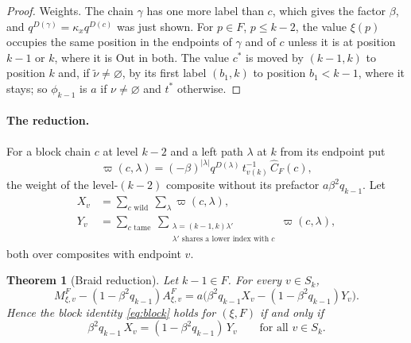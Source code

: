 \documentclass[11pt]{article}
\newtheorem{theorem}[proposition]{Theorem}
\begin{document}
\begin{proof}
Weights. The chain $\gamma$ has one more label than $c$, which gives
the factor $\beta$, and $q^{D(\gamma)}=\kappa_xq^{D(c)}$ was just
shown. For $p\in F$, $p\leq k-2$, the value $\xi(p)$ occupies the same
position in the endpoints of $\gamma$ and of $c$ unless it is at
position $k-1$ or $k$, where it is Out in both. The value $c^\ast$ is
moved by $(k-1,k)$ to position $k$ and, if $\tilde\nu\neq\varnothing$,
by its first label $(b_1,k)$ to position $b_1<k-1$, where it stays;
so $\phi_{k-1}$ is $a$ if $\nu\neq\varnothing$ and $t^\ast$ otherwise.
\end{proof}

\paragraph{The reduction.}
For a block chain $c$ at level $k-2$ and a left path $\lambda$ at $k$
from its endpoint put
\[
 \varpi(c,\lambda)=(-\beta)^{|\lambda|}q^{D(\lambda)}\,t^{-1}_{v(k)}\,\widehat C_F(c),
\]
the weight of the level-$(k-2)$ composite without its prefactor
$a\beta^2q_{k-1}$. Let
\begin{align*}
 X_v&=\sum_{c\text{ wild}}\ \sum_{\lambda}\varpi(c,\lambda),\\
 Y_v&=\sum_{c\text{ tame}}\ \sum_{\substack{\lambda=(k-1,k)\lambda'\\
        \lambda'\text{ shares a lower index with }c}}\varpi(c,\lambda),
\end{align*}
both over composites with endpoint $v$.

\begin{theorem}[Braid reduction]\label{thm:braid-reduction}
Let $k-1\in F$. For every $v\in S_k$,
\[
 M^F_{\xi,v}-(1-\beta^2q_{k-1})A^F_{\xi,v}
 =a\bigl(\beta^2q_{k-1}X_v-(1-\beta^2q_{k-1})Y_v\bigr).
\]
Hence the block identity \eqref{eq:block} holds for $(\xi,F)$ if and
only if
\begin{equation}\label{eq:wild}
 \beta^2q_{k-1}\,X_v=(1-\beta^2q_{k-1})\,Y_v\qquad\text{for all }v\in S_k.
\end{equation}
\end{theorem}
\end{document}
